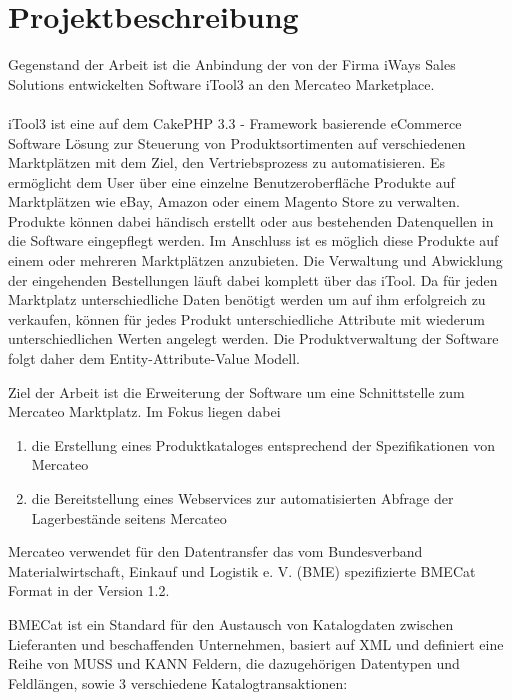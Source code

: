\section{Projektbeschreibung}
Gegenstand der Arbeit ist die Anbindung der von der Firma iWays Sales Solutions entwickelten Software iTool3 an den Mercateo Marketplace. \\\\
iTool3 ist eine auf dem CakePHP 3.3 - Framework basierende eCommerce Software Lösung zur Steuerung von
Produktsortimenten auf verschiedenen Marktplätzen mit dem Ziel, den
Vertriebsprozess zu automatisieren. Es ermöglicht dem User über eine einzelne
Benutzeroberfläche Produkte auf Marktplätzen wie eBay, Amazon oder einem Magento Store
zu verwalten. Produkte können dabei händisch erstellt oder aus bestehenden Datenquellen in die Software
eingepflegt werden. Im Anschluss ist es möglich diese Produkte auf einem oder mehreren Marktplätzen anzubieten.
Die Verwaltung und Abwicklung der eingehenden Bestellungen läuft dabei komplett über das iTool.
Da für jeden Marktplatz unterschiedliche Daten benötigt werden um auf ihm erfolgreich zu verkaufen, können für jedes Produkt unterschiedliche Attribute mit wiederum unterschiedlichen Werten angelegt werden.
Die Produktverwaltung der Software folgt daher dem Entity-Attribute-Value Modell.


Ziel der Arbeit ist die Erweiterung der Software um eine Schnittstelle zum Mercateo Marktplatz.
Im Fokus liegen dabei 
\begin{enumerate}
\item die Erstellung eines Produktkataloges entsprechend der Spezifikationen von Mercateo
\item die Bereitstellung eines Webservices zur automatisierten Abfrage der Lagerbestände seitens Mercateo
\end{enumerate}

Mercateo verwendet für den Datentransfer das vom Bundesverband Materialwirtschaft, Einkauf und Logistik e. V. (BME) spezifizierte BMECat Format in der Version 1.2.

BMECat ist ein Standard für den Austausch von Katalogdaten zwischen Lieferanten und beschaffenden Unternehmen, basiert auf XML und definiert eine Reihe von MUSS und KANN Feldern,
die dazugehörigen Datentypen und Feldlängen, sowie 3 verschiedene Katalogtransaktionen:

